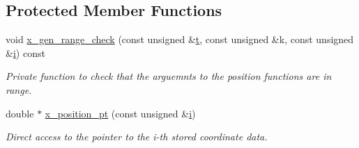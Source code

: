 \subsection*{Protected Member Functions}
\begin{DoxyCompactItemize}
\item 
void \hyperlink{classoomph_1_1Node_a58e9d5a62ae31a6512bfa7ef897cf3c6}{x\+\_\+gen\+\_\+range\+\_\+check} (const unsigned \&\hyperlink{cfortran_8h_af6f0bd3dc13317f895c91323c25c2b8f}{t}, const unsigned \&k, const unsigned \&\hyperlink{cfortran_8h_adb50e893b86b3e55e751a42eab3cba82}{i}) const
\begin{DoxyCompactList}\small\item\em Private function to check that the arguemnts to the position functions are in range. \end{DoxyCompactList}\item 
double $\ast$ \hyperlink{classoomph_1_1Node_a8456de82f2acc51c19644fc8d248e7df}{x\+\_\+position\+\_\+pt} (const unsigned \&\hyperlink{cfortran_8h_adb50e893b86b3e55e751a42eab3cba82}{i})
\begin{DoxyCompactList}\small\item\em Direct access to the pointer to the i-\/th stored coordinate data. \end{DoxyCompactList}\end{DoxyCompactItemize}
